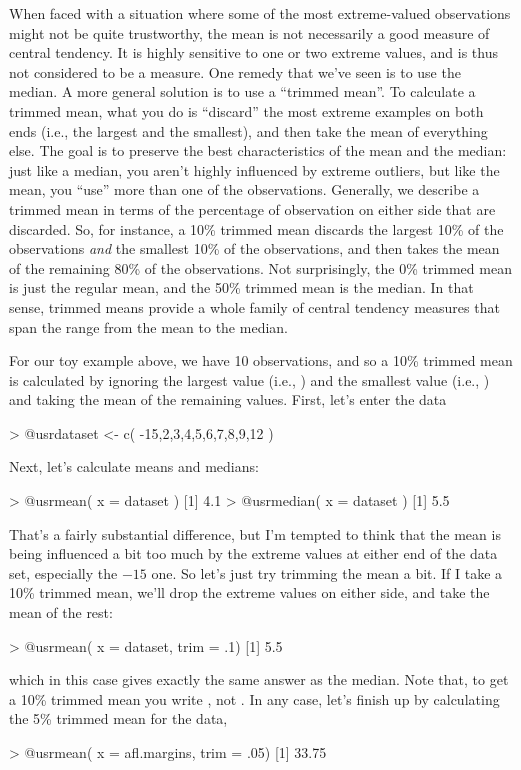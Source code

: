 When faced with a situation where some of the most extreme-valued observations might not be quite trustworthy, the mean is not necessarily a good measure of central tendency. It is highly sensitive to one or two extreme values, and is thus not considered to be a  measure. One remedy that we've seen is to use the median. A more general solution is to use a ``trimmed mean''.  To calculate a trimmed mean, what you do is ``discard'' the most extreme examples on both ends (i.e., the largest and the smallest), and then take the mean of everything else. The goal is to preserve the best characteristics of the mean and the median: just like a median, you aren't highly influenced by extreme outliers, but like the mean, you ``use'' more than one of the observations. Generally, we describe a trimmed mean in terms of the percentage of observation on either side that are discarded. So, for instance, a 10\% trimmed mean discards the largest 10\% of the observations {\it and} the smallest 10\% of the observations, and then takes the mean of the remaining 80\% of the observations. Not surprisingly, the 0\% trimmed mean is just the regular mean, and the 50\% trimmed mean is the median. In that sense, trimmed means provide a whole family of central tendency measures that span the range from the mean to the median.


For our toy example above, we have 10 observations, and so a 10\% trimmed mean is calculated by ignoring the largest value (i.e., ) and the smallest value (i.e., ) and taking the mean of the remaining values. First, let's enter the data
\begin{rblock1}
> @usr{dataset <- c( -15,2,3,4,5,6,7,8,9,12 )}
\end{rblock1}
Next, let's calculate means and medians:
\begin{rblock1}
> @usr{mean( x = dataset )}
[1] 4.1
> @usr{median( x = dataset )}
[1] 5.5
\end{rblock1}
That's a fairly substantial difference, but I'm tempted to think that the mean is being influenced a bit too much by the extreme values at either end of the data set, especially the $-15$ one. So let's just try trimming the mean a bit. If I take a 10\% trimmed mean, we'll drop the extreme values on either side, and take the mean of the rest: 
\begin{rblock1}
> @usr{mean( x = dataset, trim = .1)}
[1] 5.5
\end{rblock1}
which in this case gives exactly the same answer as the median. Note that, to get a 10\% trimmed mean you write , not . In any case, let's finish up by calculating the 5\% trimmed mean for the  data, 
\begin{rblock1}
> @usr{mean( x = afl.margins, trim = .05)}  
[1] 33.75
\end{rblock1}
 

